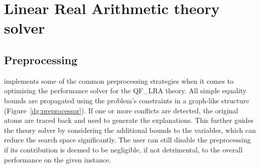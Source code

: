 \documentclass[runningheads]{llncs}
\begin{document}
\section{Linear Real Arithmetic theory solver}
\label{sec:lra-theory-solver}

\subsection*{Preprocessing}
\label{sec:preprocessing}

\dlinear implements some of the common preprocessing strategies when it comes to optimising the performance solver for the QF\_LRA theory.
All simple equality bounds are propagated using the problem's constraints in a graph-like structure (Figure~\ref{dg:preprocessor}).
If one or more conflicts are detected, the original atoms are traced back and used to generate the explanations.
This further guides the theory solver by considering the additional bounds to the variables, which can reduce the search space significantly.
The user can still disable the preprocessing if its contribution is deemed to be negligible, if not detrimental, to the overall performance on the given instance.
\end{document}
